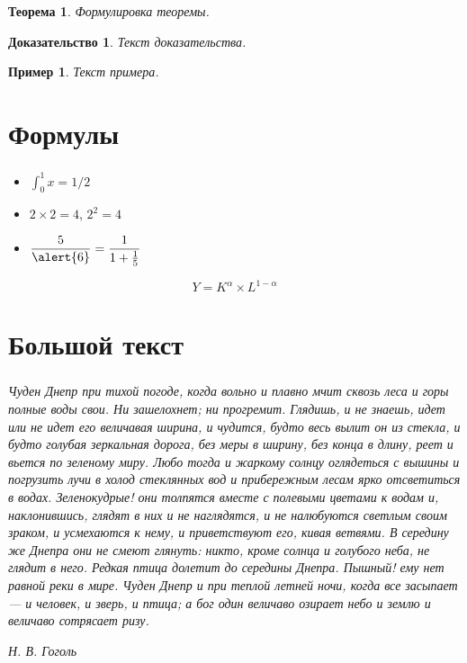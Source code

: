 \documentclass[t, dvipsnames]{beamer}  %
\newtheorem{rtheorem}{Теорема}
\newtheorem{rproof}{Доказательство}
\newtheorem{rexample}{Пример}
\begin{document}
\begin{frame}
	\frametitle{\insertsection}
	\framesubtitle{\insertsubsection}
    \begin{rtheorem}
		Формулировка теоремы.    
	\end{rtheorem}
	\begin{rproof}
		Текст доказательства.
    \end{rproof}
	\begin{rexample}
		Текст примера.
	\end{rexample}
\end{frame}

\section{Формулы}

\begin{frame}
	\frametitle{\insertsection}
	\begin{itemize}
		\item $\displaystyle\int_0^1 x=1/2$  
		\item $2\times 2=4$, $2^2=4$ 
		\item $\displaystyle\frac{5}{\alert{6}}=\frac{1}{1+\frac{1}{5}}$ 
	\end{itemize}
	\begin{equation}
	Y=K^\alpha \times L^{1-\alpha}
	\end{equation}
\end{frame}




\section{Большой текст}

\begin{frame}[shrink=7]\label{lab}  %
	\frametitle{\insertsection}
	
	\textsl{Чуден Днепр при тихой погоде, когда вольно и плавно мчит сквозь леса и горы полные воды свои. Ни зашелохнет; ни прогремит. Глядишь, и не знаешь, идет или не идет его величавая ширина, и чудится, будто весь вылит он из стекла, и будто голубая зеркальная дорога, без меры в ширину, без конца в длину, реет и вьется по зеленому миру. Любо тогда и жаркому солнцу оглядеться с вышины и погрузить лучи в холод стеклянных вод и прибережным лесам ярко отсветиться в водах. Зеленокудрые! они толпятся вместе с полевыми цветами к водам и, наклонившись, глядят в них и не наглядятся, и не налюбуются светлым  своим зраком, и усмехаются к нему, и приветствуют его, кивая ветвями. В середину же Днепра они не смеют глянуть: никто, кроме солнца и голубого неба, не глядит в него. Редкая птица долетит до середины Днепра. Пышный! ему нет равной реки в мире. Чуден Днепр и при теплой летней ночи, когда все засыпает --- и человек, и зверь, и птица; а бог один величаво озирает небо и землю и величаво сотрясает ризу.}

	\hfill{\textit{Н. В. Гоголь}}
\end{frame} 
\end{document}
